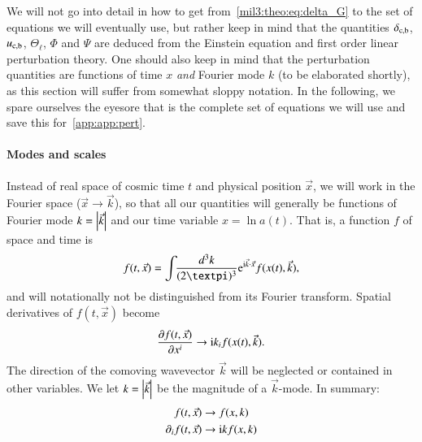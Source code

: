 We will not go into detail in how to get from~\cref{mil3:theo:eq:delta_G} to the set of equations we will eventually use, but rather keep in mind that the quantities $\delta_\mathrm{c,b}$, $u_\mathrm{c,b}$, $\Theta_\ell$, $\Phi$ and $\Psi$ are deduced from the Einstein equation and first order linear perturbation theory. One should also keep in mind that the perturbation quantities are functions of time $x$ \textit{and} Fourier mode $k$ (to be elaborated shortly), as this section will suffer from somewhat sloppy notation. In the following, we spare ourselves the eyesore that is the complete set of equations we will use and save this for~\cref{app:app:pert}. 


\paragraph{Modes and scales}
    Instead of real space of cosmic time $t$ and physical position $\vec{x}$, we will work in the Fourier space ($\vec{x}\to\vec{k}$), so that all our quantities will generally be functions of Fourier mode $k=\abs{\vec{k}}$ and our time variable $x = \ln{a(t)}$. That is, a function $f$ of space and time is
    \begin{equation}
        f(t, \vec{x}) = \int \dkkk \eu^{\im \vec{k}\cdot \vec{x}}f(x(t), \vec{k}),
    \end{equation}
    and will notationally not be distinguished from its Fourier transform. Spatial derivatives of $f(t, \vec{x})$ become
    \begin{equation}
        \pdv{f(t, \vec{x})}{x^i} \to \mathrm{i} k_i f(x(t),\vec{k}).
    \end{equation}
    The direction of the comoving wavevector $\vec{k}$ will be neglected or contained in other variables. We let $k=\abs{\vec{k}}$ be the magnitude of a $\vec{k}$-mode. In summary:
    \begin{equation}
    \begin{split}
        f(t, \vec{x}) &\to f(x, k) \\
        \partial_i f(t, \vec{x}) &\to \mathrm{i} k f(x, k)
    \end{split}
    \end{equation}

